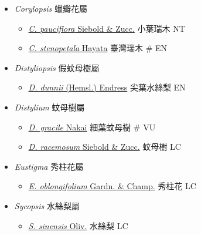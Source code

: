 
  \begin{itemize}
 \item[] \textit{Corylopsis} 蠟瓣花屬
                                
  \begin{itemize}
        \item[] \href{http://www.theplantlist.org/tpl1.1/search?q=Corylopsis+pauciflora}{\textit{C. pauciflora} Siebold \& Zucc.}   小葉瑞木   NT
        \item[] \href{http://www.theplantlist.org/tpl1.1/search?q=Corylopsis+stenopetala}{\textit{C. stenopetala} Hayata}   臺灣瑞木  \# EN
  \end{itemize}
 \item[] \textit{Distyliopsis} 假蚊母樹屬
                                
  \begin{itemize}
        \item[] \href{http://www.theplantlist.org/tpl1.1/search?q=Distyliopsis+dunnii}{\textit{D. dunnii} (Hemsl.) Endress}   尖葉水絲梨   EN
  \end{itemize}
 \item[] \textit{Distylium} 蚊母樹屬
                                
  \begin{itemize}
        \item[] \href{http://www.theplantlist.org/tpl1.1/search?q=Distylium+gracile}{\textit{D. gracile} Nakai}   細葉蚊母樹  \# VU
        \item[] \href{http://www.theplantlist.org/tpl1.1/search?q=Distylium+racemosum}{\textit{D. racemosum} Siebold \& Zucc.}   蚊母樹   LC
  \end{itemize}
 \item[] \textit{Eustigma} 秀柱花屬
                                
  \begin{itemize}
        \item[] \href{http://www.theplantlist.org/tpl1.1/search?q=Eustigma+oblongifolium}{\textit{E. oblongifolium} Gardn. \& Champ.}   秀柱花   LC
  \end{itemize}
 \item[] \textit{Sycopsis} 水絲梨屬
                                
  \begin{itemize}
        \item[] \href{http://www.theplantlist.org/tpl1.1/search?q=Sycopsis+sinensis}{\textit{S. sinensis} Oliv.}   水絲梨   LC
  \end{itemize}
  \end{itemize}

